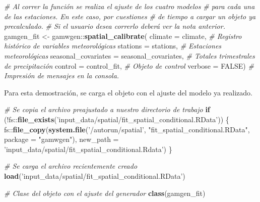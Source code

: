 \documentclass[
  12pt]{article}
\newenvironment{Shaded}{}{}
\newcommand{\CommentTok}[1]{\textcolor[rgb]{0.38,0.63,0.69}{\textit{#1}}}
\newcommand{\ControlFlowTok}[1]{\textcolor[rgb]{0.00,0.44,0.13}{\textbf{#1}}}
\newcommand{\DataTypeTok}[1]{\textcolor[rgb]{0.56,0.13,0.00}{#1}}
\newcommand{\KeywordTok}[1]{\textcolor[rgb]{0.00,0.44,0.13}{\textbf{#1}}}
\newcommand{\NormalTok}[1]{#1}
\newcommand{\OperatorTok}[1]{\textcolor[rgb]{0.40,0.40,0.40}{#1}}
\newcommand{\OtherTok}[1]{\textcolor[rgb]{0.00,0.44,0.13}{#1}}
\newcommand{\StringTok}[1]{\textcolor[rgb]{0.25,0.44,0.63}{#1}}
\begin{document}
\begin{Shaded}
\begin{Highlighting}[]
\CommentTok{# Al correr la función se realiza el ajuste de los cuatro modelos}
\CommentTok{# para cada una de las estaciones. En este caso, por cuestiones }
\CommentTok{# de tiempo a cargar un objeto ya precalculado. }
\CommentTok{# Si el usuario desea correrlo deberá ver la nota anterior.}
\NormalTok{gamgen_fit <-}\StringTok{ }\NormalTok{gamwgen}\OperatorTok{::}\KeywordTok{spatial_calibrate}\NormalTok{(}
  \DataTypeTok{climate =}\NormalTok{ climate, }
  \CommentTok{# Registro histórico de variables meteorológicas}
  \DataTypeTok{stations =}\NormalTok{ stations, }
  \CommentTok{# Estaciones meteorológicas }
  \DataTypeTok{seasonal_covariates =}\NormalTok{ seasonal_covariates, }
  \CommentTok{# Totales trimestrales de precipitación}
  \DataTypeTok{control =}\NormalTok{ control_fit, }
  \CommentTok{# Objeto de control}
  \DataTypeTok{verbose =} \OtherTok{FALSE}\NormalTok{) }
\CommentTok{# Impresión de mensajes en la consola.}
\end{Highlighting}
\end{Shaded}

Para esta demostración, se carga el objeto con el ajuste del modelo ya realizado.

\begin{Shaded}
\begin{Highlighting}[]
\CommentTok{# Se copia el archivo preajustado a nuestro directorio de trabajo}
\ControlFlowTok{if}\NormalTok{ (}\OperatorTok{!}\NormalTok{fs}\OperatorTok{::}\KeywordTok{file_exists}\NormalTok{(}\StringTok{'input_data/spatial/fit_spatial_conditional.RData'}\NormalTok{)) \{}
\NormalTok{  fs}\OperatorTok{::}\KeywordTok{file_copy}\NormalTok{(}\KeywordTok{system.file}\NormalTok{(}\StringTok{'/autorun/spatial'}\NormalTok{,}
                            \StringTok{"fit_spatial_conditional.RData"}\NormalTok{, }
                            \DataTypeTok{package =} \StringTok{"gamwgen"}\NormalTok{),}
                \DataTypeTok{new_path =} \StringTok{'input_data/spatial/fit_spatial_conditional.Rdata'}\NormalTok{)}
\NormalTok{\}}

\CommentTok{# Se carga el archivo recientemente creado}
\KeywordTok{load}\NormalTok{(}\StringTok{'input_data/spatial/fit_spatial_conditional.RData'}\NormalTok{)}

\CommentTok{# Clase del objeto con el ajuste del generador}
\KeywordTok{class}\NormalTok{(gamgen_fit)}
\end{Highlighting}
\end{Shaded}
\end{document}
